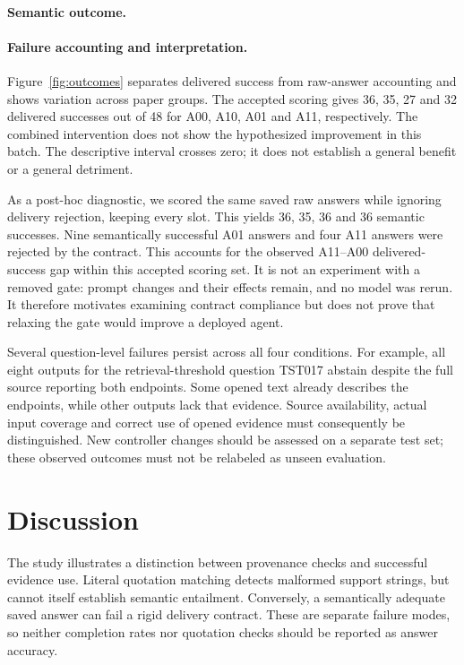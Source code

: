 \documentclass{article}
\begin{document}
\paragraph{Semantic outcome.}

\paragraph{Failure accounting and interpretation.}
Figure~\ref{fig:outcomes} separates delivered success from raw-answer accounting and shows variation across paper groups. The accepted scoring gives 36, 35, 27 and 32 delivered successes out of 48 for A00, A10, A01 and A11, respectively. The combined intervention does not show the hypothesized improvement in this batch. The descriptive interval crosses zero; it does not establish a general benefit or a general detriment.

As a post-hoc diagnostic, we scored the same saved raw answers while ignoring delivery rejection, keeping every slot. This yields 36, 35, 36 and 36 semantic successes. Nine semantically successful A01 answers and four A11 answers were rejected by the contract. This accounts for the observed A11--A00 delivered-success gap within this accepted scoring set. It is not an experiment with a removed gate: prompt changes and their effects remain, and no model was rerun. It therefore motivates examining contract compliance but does not prove that relaxing the gate would improve a deployed agent.

Several question-level failures persist across all four conditions. For example, all eight outputs for the retrieval-threshold question TST017 abstain despite the full source reporting both endpoints. Some opened text already describes the endpoints, while other outputs lack that evidence. Source availability, actual input coverage and correct use of opened evidence must consequently be distinguished. New controller changes should be assessed on a separate test set; these observed outcomes must not be relabeled as unseen evaluation.


\section{Discussion}
The study illustrates a distinction between provenance checks and successful evidence use. Literal quotation matching detects malformed support strings, but cannot itself establish semantic entailment. Conversely, a semantically adequate saved answer can fail a rigid delivery contract. These are separate failure modes, so neither completion rates nor quotation checks should be reported as answer accuracy.
\end{document}
